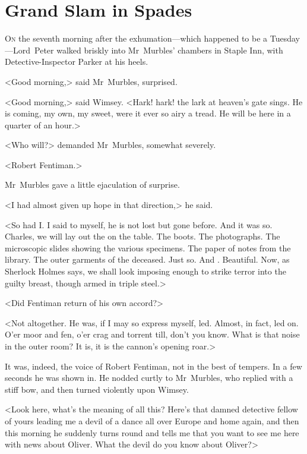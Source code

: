 \chapter{Grand Slam in Spades}

\lettrine{O}{n} the seventh morning after the exhumation—which happen\-ed to be a Tuesday—Lord~Peter walked briskly into Mr~Murb\-les' chambers in Staple Inn, with Detective-Inspector Parker at his heels.

\zz
<Good morning,> said Mr~Murbles, surprised.

<Good morning,> said Wimsey. <Hark! hark! the lark at heaven's gate sings. He is coming, my own, my sweet, were it ever so airy a tread. He will be here in a quarter of an hour.>

<Who will?> demanded Mr~Murbles, somewhat severely.

<Robert Fentiman.>

Mr~Murbles gave a little ejaculation of surprise.

<I had almost given up hope in that direction,> he said.

<So had I\@. I said to myself, he is not lost but gone before. And it was so. Charles, we will lay out the  on the table. The boots. The photographs. The microscopic slides showing the various specimens. The paper of notes from the library. The outer garments of the deceased. Just so. And . Beautiful. Now, as Sherlock Holmes says, we shall look imposing enough to strike terror into the guilty breast, though armed in triple steel.>

<Did Fentiman return of his own accord?>

<Not altogether. He was, if I may so express myself, led. Almost, in fact, led on. O'er moor and fen, o'er crag and torrent till, don't you know. What is that noise in the outer room? It is, it is the cannon's opening roar.>

It was, indeed, the voice of Robert Fentiman, not in the best of tempers. In a few seconds he was shown in. He nodded curtly to Mr~Murbles, who replied with a stiff bow, and then turned violently upon Wimsey.

<Look here, what's the meaning of all this? Here's that damned detective fellow of yours leading me a devil of a dance all over Europe and home again, and then this morning he suddenly turns round and tells me that you want to see me here with news about Oliver. What the devil do you know about Oliver?>

